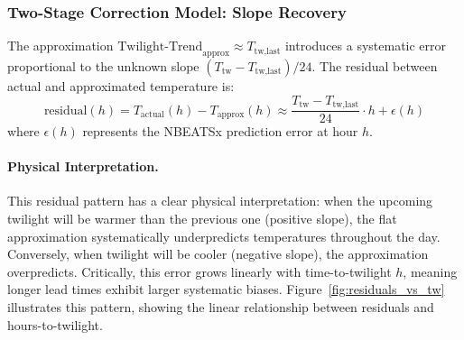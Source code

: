 \documentclass[11pt]{article}
\begin{document}
\subsubsection{Two-Stage Correction Model: Slope Recovery}

The approximation $\text{Twilight-Trend}_{\text{approx}} \approx T_{\text{tw,last}}$ introduces a systematic error proportional to the unknown slope $(T_{\text{tw}} - T_{\text{tw,last}})/24$. The residual between actual and approximated temperature is:
\begin{equation}
\text{residual}(h) = T_{\text{actual}}(h) - T_{\text{approx}}(h) \approx \frac{T_{\text{tw}} - T_{\text{tw,last}}}{24} \cdot h + \epsilon(h)
\end{equation}
where $\epsilon(h)$ represents the NBEATSx prediction error at hour $h$.

\paragraph{Physical Interpretation.}
This residual pattern has a clear physical interpretation: when the upcoming twilight will be warmer than the previous one (positive slope), the flat approximation systematically underpredicts temperatures throughout the day. Conversely, when twilight will be cooler (negative slope), the approximation overpredicts. Critically, this error grows linearly with time-to-twilight $h$, meaning longer lead times exhibit larger systematic biases. Figure~\ref{fig:residuals_vs_tw} illustrates this pattern, showing the linear relationship between residuals and hours-to-twilight.
\end{document}
